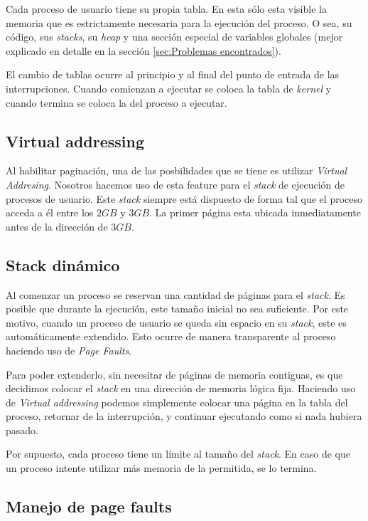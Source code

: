 \documentclass[a4paper,10pt]{article}
\begin{document}
Cada proceso de usuario tiene su propia tabla.
En esta sólo esta visible la memoria que es estrictamente necesaria para la ejecución del proceso.
O sea, su código, sus \textit{stacks}, su \textit{heap} y una sección especial de variables globales (mejor explicado en detalle en la sección  
\ref{sec:Problemas encontrados}).

El cambio de tablas ocurre al principio y al final del punto de entrada de las interrupciones.
Cuando comienzan a ejecutar se coloca la tabla de \textit{kernel} y cuando termina se coloca la del proceso a ejecutar.

\subsection{Virtual addressing}

Al habilitar paginación, una de las posbilidades que se tiene es utilizar \textit{Virtual Addresing}.
Nosotros hacemos uso de esta feature para el \textit{stack} de ejecución de procesos de usuario.
Este \textit{stack} siempre está dispuesto de forma tal que el proceso acceda a él entre los $ 2GB $ y $ 3GB $.
La primer página esta ubicada inmediatamente antes de la dirección de $ 3GB $.

\subsection{Stack dinámico}

Al comenzar un proceso se reservan una cantidad de páginas para el \textit{stack}.
Es posible que durante la ejecución, este tamaño inicial no sea suficiente.
Por este motivo, cuando un proceso de usuario se queda sin espacio en su \textit{stack}, este es automáticamente extendido.
Esto ocurre de manera transparente al proceso haciendo uso de \textit{Page Faults}.

Para poder extenderlo, sin necesitar de páginas de memoria contiguas, es que decidimos colocar el \textit{stack} en una dirección de memoria lógica fija.
Haciendo uso de \textit{Virtual addressing} podemos simplemente colocar una página en la tabla del proceso, retornar de la interrupción, y continuar ejecutando
 como si nada hubiera pasado.

Por supuesto, cada proceso tiene un límite al tamaño del \textit{stack}.
En caso de que un proceso intente utilizar más memoria de la permitida, se lo termina.

\subsection{Manejo de page faults}
\end{document}
